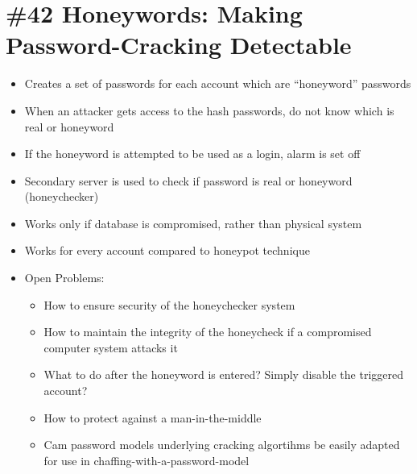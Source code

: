\section{\#42 Honeywords: Making Password-Cracking Detectable}
\begin{itemize}
	\item Creates a set of passwords for each account which are ``honeyword'' passwords
	\item When an attacker gets access to the hash passwords, do not know which is real or honeyword
	\item If the honeyword is attempted to be used as a login, alarm is set off
	\item Secondary server is used to check if password is real or honeyword (honeychecker)
	\item Works only if database is compromised, rather than physical system
	\item Works for every account compared to honeypot technique
	\item Open Problems:
	\begin{itemize}
		\item How to ensure security of the honeychecker system
		\item How to maintain the integrity of the honeycheck if a compromised computer system attacks it
		\item What to do after the honeyword is entered? Simply disable the triggered account?
		\item How to protect against a man-in-the-middle
		\item Cam password models underlying cracking algortihms be easily adapted for use in chaffing-with-a-password-model
	\end{itemize}
\end{itemize}